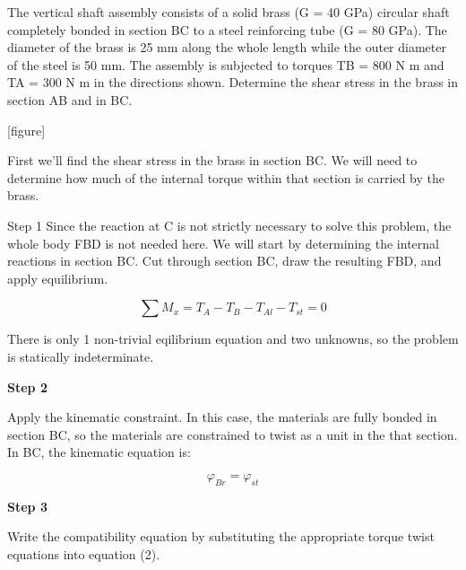 \documentclass[
  letterpaper,
  DIV=11,
  numbers=noendperiod]{scrreprt}
\begin{document}
\begin{tcolorbox}[enhanced jigsaw, breakable, opacityback=0, toptitle=1mm, left=2mm, colback=white, opacitybacktitle=0.6, colframe=quarto-callout-note-color-frame, titlerule=0mm, arc=.35mm, leftrule=.75mm, bottomtitle=1mm, colbacktitle=quarto-callout-note-color!10!white, rightrule=.15mm, title={Example 6.6: Needs title}, bottomrule=.15mm, toprule=.15mm, coltitle=black]

The vertical shaft assembly consists of a solid brass (G = 40 GPa)
circular shaft completely bonded in section BC to a steel reinforcing
tube (G = 80 GPa). The diameter of the brass is 25 mm along the whole
length while the outer diameter of the steel is 50 mm. The assembly is
subjected to torques TB = 800 N m and TA = 300 N m in the directions
shown. Determine the shear stress in the brass in section AB and in BC.

{[}figure{]}

\begin{tcolorbox}[enhanced jigsaw, breakable, opacityback=0, toptitle=1mm, left=2mm, colback=white, opacitybacktitle=0.6, colframe=quarto-callout-note-color-frame, titlerule=0mm, arc=.35mm, leftrule=.75mm, bottomtitle=1mm, colbacktitle=quarto-callout-note-color!10!white, rightrule=.15mm, title={Solution}, bottomrule=.15mm, toprule=.15mm, coltitle=black]

First we'll find the shear stress in the brass in section BC. We will
need to determine how much of the internal torque within that section is
carried by the brass.

Step 1 Since the reaction at C is not strictly necessary to solve this
problem, the whole body FBD is not needed here. We will start by
determining the internal reactions in section BC. Cut through section
BC, draw the resulting FBD, and apply equilibrium.

\[
\sum M_x=T_A-T_B-T_{A l}-T_{s t}=0
\]

There is only 1 non-trivial eqilibrium equation and two unknowns, so the
problem is statically indeterminate.

\textbf{Step 2}

Apply the kinematic constraint. In this case, the materials are fully
bonded in section BC, so the materials are constrained to twist as a
unit in the that section. In BC, the kinematic equation is:

\[
\varphi_{B r}=\varphi_{s t}
\]

\textbf{Step 3}

Write the compatibility equation by substituting the appropriate torque
twist equations into equation (2).


\end{tcolorbox}
\end{tcolorbox}
\end{document}
